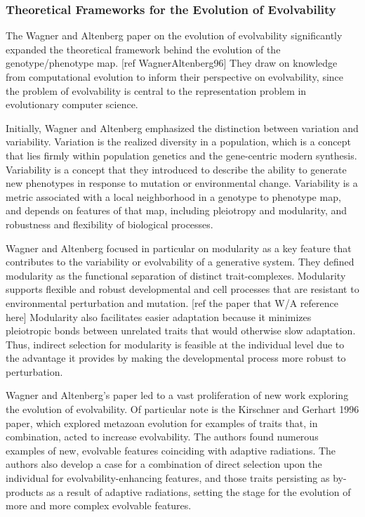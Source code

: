 \subsubsection{Theoretical Frameworks for the Evolution of Evolvability}

The Wagner and Altenberg paper on the evolution of evolvability significantly expanded the theoretical framework behind the evolution of the genotype/phenotype map. [ref WagnerAltenberg96] They draw on knowledge from computational evolution to inform their perspective on evolvability, since the problem of evolvability is central to the representation problem in evolutionary computer science. 

Initially, Wagner and Altenberg emphasized the distinction between variation and variability. Variation is the realized diversity in a population, which is a concept that lies firmly within population genetics and the gene-centric modern synthesis.  Variability is a concept that they introduced to describe the ability to generate new phenotypes in response to mutation or environmental change. Variability is a metric associated with a local neighborhood in a genotype to phenotype map, and depends on features of that map, including pleiotropy and modularity, and robustness and flexibility of biological processes.

Wagner and Altenberg focused in particular on modularity as a key feature that contributes to the variability or evolvability of a generative system. They defined modularity as the functional separation of distinct trait-complexes. Modularity supports flexible and robust developmental and cell processes that are resistant to environmental perturbation and mutation. [ref the paper that W/A reference here] Modularity also facilitates easier adaptation because it minimizes pleiotropic bonds between unrelated traits that would otherwise slow adaptation. Thus, indirect selection for modularity is feasible at the individual level due to the advantage it provides by making the developmental process more robust to perturbation.

Wagner and Altenberg’s paper led to a vast proliferation of new work exploring the evolution of evolvability. Of particular note is the Kirschner and Gerhart 1996 paper, which explored metazoan evolution for examples of traits that, in combination, acted to increase evolvability. The authors found numerous examples of new, evolvable features coinciding with adaptive radiations. The authors also develop a case for a combination of direct selection upon the individual for evolvability-enhancing features, and those traits persisting as by-products as a result of adaptive radiations, setting the stage for the evolution of more and more complex evolvable features.

